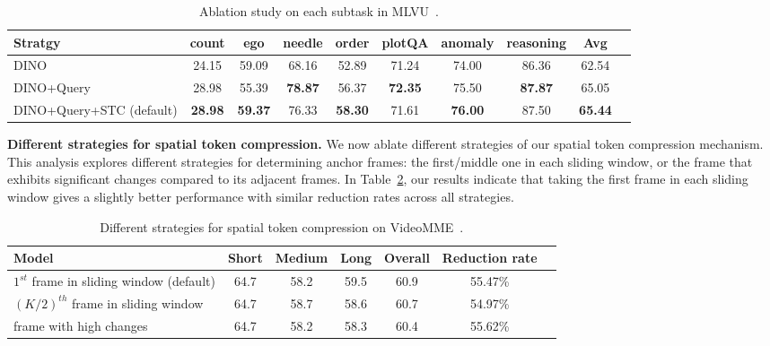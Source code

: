 \begin{table}[!htbp]
    \centering
\begin{adjustbox}{width=0.95\linewidth,center}
\begin{tabular}{lccccccccc}
\toprule \textbf{Stratgy} & \multicolumn{1}{c}{ \textbf{count} } & \multicolumn{1}{c}{ \textbf{ego} } &  \multicolumn{1}{c}{\textbf{needle}} & \multicolumn{1}{c}{ \textbf{order} } & \multicolumn{1}{c}{\textbf{plotQA}} & \multicolumn{1}{c}{\textbf{anomaly}} & \multicolumn{1}{c}{\textbf{reasoning}} & \multicolumn{1}{c}{\textbf{Avg}} \\
\midrule
DINO & 24.15 & 59.09 & 68.16 & 52.89 & 71.24 & 74.00 & 86.36 & 62.54 \\
DINO+Query & 28.98 & 55.39 & \textbf{78.87} & 56.37 & \textbf{72.35} & 75.50 & \textbf{87.87} & 65.05 \\
\rowcolor{blue!10} DINO+Query+STC (default) & \textbf{28.98} & \textbf{59.37} & 76.33 & \textbf{58.30}	& 71.61 & \textbf{76.00} & 87.50 & \textbf{65.44} \\
\bottomrule
\end{tabular}
\end{adjustbox}
\caption{Ablation study on each subtask in MLVU~\citep{zhou2024mlvu}.}
\label{tab:mlvu}
\end{table}

\noindent\textbf{Different strategies for spatial token compression.} We now ablate different strategies of our spatial token compression mechanism. This analysis explores different strategies for determining anchor frames: the first/middle one in each sliding window, or the frame that exhibits significant changes compared to its adjacent frames. In Table~\ref{tab:stcab}, our results indicate that taking the first frame in each sliding window gives a slightly better performance with similar reduction rates across all strategies.

\begin{table}[!ht]
    \centering
    \renewcommand{\arraystretch}{1.3}
    \begin{adjustbox}{width=0.9\linewidth,center}
    \begin{tabular}{lcccccc}
    \toprule
        \textbf{Model}  & \textbf{Short} & \textbf{Medium} & \textbf{Long} & \textbf{Overall} & \textbf{Reduction rate} \\
        \midrule
        \rowcolor{blue!10} $1^{st}$ frame in sliding window (default) & 64.7	& 58.2 & 59.5 & 60.9 & 55.47\% \\
        $(K/2)^{th}$ frame in sliding window & 64.7 & 58.7	& 58.6 & 60.7 & 54.97\% \\ 
        frame with high changes & 64.7 & 58.2 & 58.3 & 60.4 & 55.62\% \\
        \bottomrule
    \end{tabular}
    \end{adjustbox}
    \caption{Different strategies for spatial token compression on VideoMME~\citep{fu2024video}.}
    \label{tab:stcab}
\end{table}

